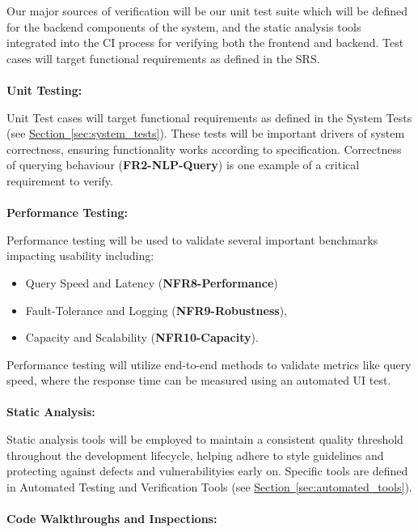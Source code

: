\documentclass[12pt, titlepage]{article}
\begin{document}
Our major sources of verification will be our unit test suite which will be defined for the backend 
components of the system, and the static analysis tools integrated into the CI process for verifying 
both the frontend and backend. Test cases will target functional requirements as defined in the SRS.
\\
\\
\textbf{Unit Testing:}

Unit Test cases will target functional requirements as defined in the System Tests 
(see \hyperref[sec:system_tests]{Section~\ref{sec:system_tests}}). These tests will be 
important drivers of system correctness, ensuring functionality works according to specification. 
Correctness of querying behaviour (\textbf{FR2-NLP-Query}) is one example of a critical requirement to verify. 
\\
\\
\textbf{Performance Testing:}

Performance testing will be used to validate several important benchmarks impacting usability including:
\begin{itemize}
  \item Query Speed and Latency (\textbf{NFR8-Performance})
    \item Fault-Tolerance and Logging (\textbf{NFR9-Robustness}),
  \item Capacity and Scalability (\textbf{NFR10-Capacity}). 
\end{itemize}

Performance testing will utilize end-to-end methods to validate metrics like query speed, where 
the response time can be measured using an automated UI test. 
\\
\\
\textbf{Static Analysis:}

Static analysis tools will be employed to maintain a consistent quality threshold throughout the 
development lifecycle, helping adhere to style guidelines and protecting against defects and 
vulnerabilityies early on. Specific tools are defined in Automated Testing and Verification Tools 
(see \hyperref[sec:automated_tools]{Section~\ref{sec:automated_tools}}).  
\\
\\
\textbf{Code Walkthroughs and Inspections:}
\end{document}
